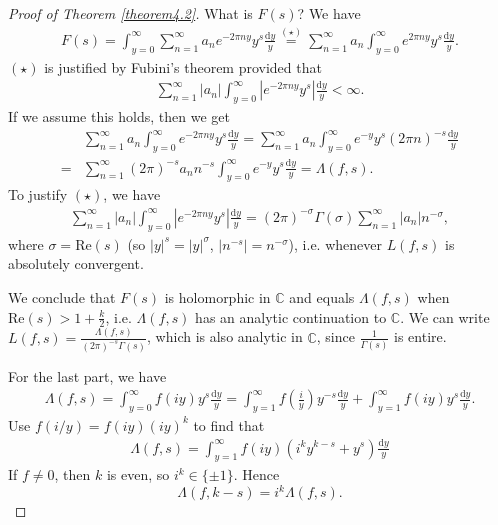 \documentclass{article}
\theoremstyle{definition}
\begin{document}
\begin{proof}[Proof of Theorem \ref{theorem4.2}]
    What is $F(s)$? We have
    \begin{align*}
        F(s) = \int_{y=0}^{\infty} \sum_{n=1}^{\infty} a_n e^{-2\pi n y}y^s \frac{\mathrm{d}y}{y} \stackrel{(\star)}{=} \sum_{n=1}^{\infty} a_n \int_{y=0}^{\infty} e^{2\pi n y} y^s \frac{\mathrm{d}y}{y}.
    \end{align*}
    $(\star)$ is justified by Fubini's theorem provided that 
    \begin{align*}
        \sum_{n=1}^{\infty} |a_n| \int_{y=0}^{\infty} |e^{-2\pi n y}y^{s}| \frac{\mathrm{d}y}{y} < \infty.
    \end{align*}
    If we assume this holds, then we get
    \begin{align*}
        &\sum_{n=1}^{\infty} a_n \int_{y=0}^{\infty} e^{-2\pi n y}y^s \frac{\mathrm{d}y}{y} = \sum_{n=1}^{\infty} a_n \int_{y=0}^{\infty} e^{-y}y^s (2\pi n)^{-s}\frac{\mathrm{d}y}{y} \\
        =& \sum_{n=1}^{\infty} (2\pi)^{-s} a_n n^{-s} \int_{y=0}^{\infty} e^{-y}y^s \frac{\mathrm{d}y}{y} = \Lambda(f,s).
    \end{align*}
    To justify $(\star)$, we have 
    \begin{align*}
        \sum_{n=1}^{\infty} |a_n| \int_{y=0}^{\infty} |e^{-2\pi n y}y^{s}| \frac{\mathrm{d}y}{y} = (2\pi)^{-\sigma}\Gamma(\sigma)\sum_{n=1}^{\infty} |a_n|n^{-\sigma},
    \end{align*}
    where $\sigma = \text{Re}(s)$ (so $|y|^s = |y|^{\sigma}$, $|n^{-s}|=n^{-\sigma}$), i.e. whenever $L(f,s)$ is absolutely convergent.
    \vspace{1mm}
     
    We conclude that $F(s)$ is holomorphic in $\mathbb{C}$ and equals $\Lambda(f,s)$ when $\text{Re}(s)>1+\frac{k}{2}$, i.e. $\Lambda(f,s)$ has an analytic continuation to $\mathbb{C}$. We can write $L(f,s) = \frac{\Lambda(f,s)}{(2\pi)^{-s}\Gamma(s)}$, which is also analytic in $\mathbb{C}$, since $\frac{1}{\Gamma(s)}$ is entire.
    \vspace{1mm}
     
    For the last part, we have 
    \begin{align*}
        \Lambda(f,s) = \int_{y=0}^{\infty} f(iy)y^s \frac{\mathrm{d}y}{y} = \int_{y=1}^{\infty} f\left(\frac{i}{y}\right)y^{-s}\frac{\mathrm{d}y}{y} + \int_{y=1}^{\infty} f(iy)y^s\frac{\mathrm{d}y}{y}.
    \end{align*}
    Use $f(i/y)=f(iy)(iy)^k$ to find that 
    \begin{align*}
        \Lambda(f,s) = \int_{y=1}^{\infty} f(iy) \left(i^k y^{k-s}+y^s \right)\frac{\mathrm{d}y}{y}
    \end{align*}
    If $f \neq 0$, then $k$ is even, so $i^k \in \{\pm 1\}$. Hence \[
    \Lambda(f,k-s) = i^k \Lambda(f,s).
    \]
\end{proof}
\end{document}
